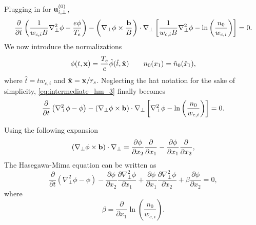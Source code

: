 \documentclass[11pt]{article}
\begin{document}
Plugging in for $\mathbf{u}_{i,\perp}^{(0)}$,
\begin{equation}
\label{eq:intermediate_hm_3}
   \frac{\partial}{\partial t}\left ( \frac{1}{w_{c,i} B}\nabla_\perp^2 \phi - \frac{e \phi}{T_e} \right ) - \left( \nabla_\perp \phi \times \frac{\mathbf{b}}{B} \right) \cdot \nabla_\perp \left [ \frac{1}{w_{c,i} B} \nabla_\perp^2 \phi - \ln \left ( \frac{n_0}{w_{c,i}} \right) \right ] = 0.
\end{equation}
We now introduce the normalizations
\begin{equation}
    \phi(t,\mathbf{x}) = \frac{T_e}{e} \hat{\phi}(\hat{t},\hat{\mathbf{x}}) \qquad n_0(x_1) = \hat{n}_0(\hat{x}_1),
\end{equation}
where $\hat{t} = t w_{c,i}$ and $\hat{\mathbf{x}} = \mathbf{x} / r_s$. Neglecting the hat notation for the sake of simplicity, \cref{eq:intermediate_hm_3} finally becomes
\begin{equation}
    \label{eq:hasegawa_mima}
   \frac{\partial}{\partial t}\left ( \nabla_\perp^2 \phi - \phi \right ) - \left( \nabla_\perp \phi \times \mathbf{b} \right) \cdot \nabla_\perp \left [ \nabla_\perp^2 \phi - \ln \left( \frac{n_0}{w_{c,i}} \right) \right ] = 0.
\end{equation}

Using the following expansion
\begin{equation}
    \left ( \nabla_\perp \phi \times \mathbf{b} \right ) \cdot \nabla_\perp = \frac{\partial \phi}{\partial x_2} \frac{\partial}{\partial x_1} - \frac{\partial \phi}{\partial x_1} \frac{\partial}{\partial x_2},
\end{equation}
The Hasegawa-Mima equation can be written as
\begin{equation}
   \frac{\partial}{\partial t}\left ( \nabla_\perp^2 \phi - \phi \right ) - \frac{\partial \phi}{\partial x_2} \frac{\partial \nabla_\perp^2 \phi}{\partial x_1} + \frac{\partial \phi}{\partial x_1} \frac{\partial \nabla_\perp^2 \phi}{\partial x_2} + \beta \frac{\partial \phi}{\partial x_2} = 0,
\end{equation}
where 
\begin{equation}
    \beta = \frac{\partial}{\partial x_1} \ln \left ( \frac{n_0}{w_{c,i}} \right ).
\end{equation}

\end{document}

